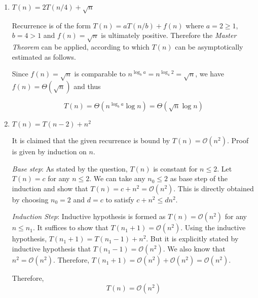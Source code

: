 \begin{enumerate}[label=(\alph*)]
\item $T(n) = 2T(n/4) + \sqrt{n}$

Recurrence is of the form $T(n) = aT(n/b)+f(n)$ where $a=2 \geq 1$, $b=4 > 1$ and $f(n) = \sqrt{n}$ is ultimately positive. Therefore the \emph{Master Theorem} can be applied, according to which $T(n)$ can be asymptotically estimated as follows.

Since $f(n) = \sqrt{n}$ is comparable to $n^{\log_b a}=n^{\log_4 2}=\sqrt{n}$, we have $ f(n) = \Theta(\sqrt{n})$ and thus

\begin{equation}
T(n) = \Theta(n^{\log_b a}\log n) = \Theta(\sqrt{n} \log n)
\end{equation}

\item $T(n) = T(n-2) + n^2$

It is claimed that the given recurrence is bound by $T(n) = \mathcal{O}(n^2)$. Proof is given by induction on $n$.

\emph{Base step}: As stated by the question, $T(n)$ is constant for $n \leq 2$. Let $T(n) = c$ for any $n \leq 2$. We can take any $n_0 \leq 2$ as base step of the induction and show that $T(n) = c + n^2 = \mathcal{O}(n^2)$. This is directly obtained by choosing $n_0 = 2$ and $d = c$ to satisfy $c + n^2 \leq d n^2$.

\emph{Induction Step}: Inductive hypothesis is formed as $T(n) = \mathcal{O}(n^2)$ for any $n \leq n_1$. It suffices to show that $T(n_1+1) = \mathcal{O}(n^2)$. Using the inductive hypothesis, $T(n_1+1) = T(n_1-1) + n^2$. But it is explicitly stated by inductive hypothesis that $T(n_1-1) = \mathcal{O}(n^2)$. We also know that $n^2 = \mathcal{O}(n^2)$. Therefore, $T(n_1+1) = \mathcal{O}(n^2) + \mathcal{O}(n^2) = \mathcal{O}(n^2)$.

Therefore,
\begin{equation}
T(n) = \mathcal{O}(n^2)
\end{equation}

\end{enumerate}

